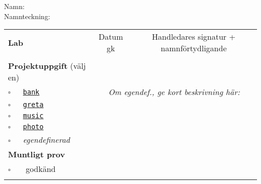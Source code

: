 \vspace{2.5em}\noindent Namn: \dotfill\\

\vspace{1em}\noindent Namnteckning: \dotfill\\

\newcommand{\LabRow}[1]{\\[-1.1em] \hyperref[section:lab:#1]{\texttt{#1}} & \dotfill &  \dotfill  \\ \addlinespace }

\begin{table}[h]
\vspace{1em}
\begin{tabular}{lcc}
\toprule \addlinespace
{\sffamily\bfseries\small Lab} & {\sffamily\small Datum gk} &	
{\sffamily\small Handledares signatur + namnförtydligande}\\ \addlinespace 
\\[-0.5em]

\addlinespace 
\addlinespace\addlinespace
{\sffamily\small {\bfseries Projektuppgift} (välj en)	} & \dotfill &  \dotfill  \\
\addlinespace\addlinespace %
{\Large$\square$}\texttt{~~~\hyperref[section:proj:bank]{bank}} &
\multicolumn{2}{c}{\textit{Om egendef., ge kort beskrivning här:}}  \\ \addlinespace
{\Large$\square$}\texttt{~~~\hyperref[section:proj:greta]{greta}} \\ \addlinespace
{\Large$\square$}\texttt{~~~\hyperref[section:proj:music]{music}} \\ \addlinespace
{\Large$\square$}\texttt{~~~\hyperref[section:proj:photo]{photo}}  \\ \addlinespace
{\Large$\square$}\texttt{~~~}\textit{egendefinerad}  \\
\addlinespace\addlinespace
\addlinespace
{\sffamily\small {\bfseries Muntligt prov}} &  & \\
\addlinespace\addlinespace{}
{\Large$\square$}\texttt{~~~} godkänd & \dotfill &  \dotfill \\
\addlinespace\addlinespace\bottomrule
\end{tabular}
\end{table}
